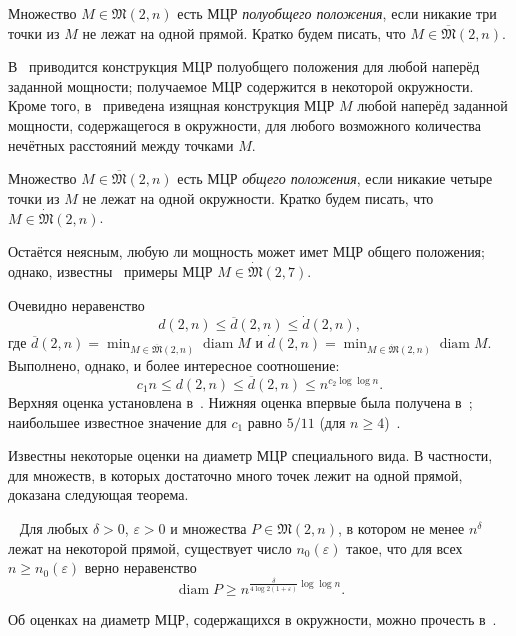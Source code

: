 \documentclass[11pt,twoside,draft
]{article}
\begin{document}
\begin{definition}
	Множество $M\in\mathfrak{M}(2,n)$ есть МЦР \textit{полуобщего положения},
	если никакие три точки из $M$ не лежат на одной прямой.
	Кратко будем писать, что $M\in \overline{\mathfrak{M}}(2,n)$.
\end{definition}

В~\cite{harborth1993upper} приводится конструкция МЦР полуобщего положения для любой наперёд заданной мощности;
получаемое МЦР содержится в некоторой окружности.
Кроме того, в~\cite{piepmeyer1996maximum} приведена изящная конструкция МЦР $M$ любой наперёд заданной мощности,
содержащегося в окружности,
для любого возможного количества нечётных расстояний между точками $M$.

\begin{definition}
	Множество $M\in\overline{\mathfrak{M}}(2,n)$ есть МЦР \textit{общего положения},
	если никакие четыре точки из $M$ не лежат на одной окружности.
	Кратко будем писать, что $M\in \dot{\mathfrak{M}}(2,n)$.
\end{definition}

Остаётся неясным, любую ли мощность может имет МЦР общего положения;
однако, известны~\cite{kreisel2008heptagon,kurz2013constructing} примеры МЦР $M\in \dot{\mathfrak{M}}(2,7)$.

Очевидно неравенство
\begin{equation*}
	d(2,n) \leq \overline{d}(2,n) \leq \dot{d}(2,n)
	,
\end{equation*}
где
$
	\overline{d}(2,n) = \min_{M\in\overline{\mathfrak{M}}(2,n)} \operatorname{diam} M
$
и
$
	\dot{d}(2,n) = \min_{M\in\dot{\mathfrak{M}}(2,n)} \operatorname{diam} M
$.
Выполнено, однако, и более интересное соотношение:
\begin{equation*}
	c_1 n \leq d(2,n) \leq \overline{d}(2,n) \leq n^{c_2 \log \log n}
	.
\end{equation*}
Верхняя оценка установлена в~\cite{harborth1993upper}.
Нижняя оценка впервые была получена в~\cite{solymosi2003note};
наибольшее известное значение для $c_1$ равно $5/11$ (для $n\geq 4$)~\cite{my-pps-linear-bound-2019}.

Известны некоторые оценки на диаметр МЦР специального вида.
В частности, для множеств, в которых достаточно много точек лежит на одной прямой,
доказана следующая теорема.
\begin{theorem}~\cite[теорема 4]{kurz2008minimum}
	Для любых $\delta > 0$, $\varepsilon > 0$ и множества $P\in\mathfrak{M}(2,n)$,
	в котором не менее $n^\delta$ лежат на некоторой прямой, существует число $n_0 (\varepsilon)$
	такое, что для всех $n \geq n_0 (\varepsilon)$ верно неравенство
	\begin{equation}
		\operatorname{diam} P \geq n^{\frac{\delta}{4 \log 2(1+\varepsilon)}\log \log n}
		.
	\end{equation}
\end{theorem}
Об оценках на диаметр МЦР,
содержащихся в окружности, можно прочесть в~\cite{bat2018number}.
\end{document}
